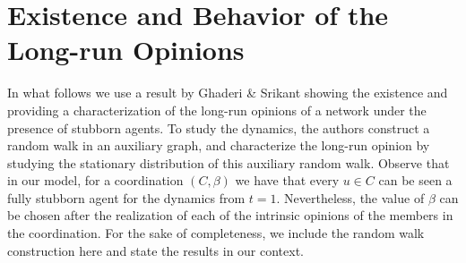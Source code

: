 \documentclass[letterpaper,11pt]{article}
\newcommand{\cost}{\mathsf{cost}}
\newtheorem{lemma}{Lemma}
\newcommand{\vvcom}[1]{\todo[color=red!25!white]{Victor: #1}}
\begin{document}


\begin{comment}
\noindent{\it Sustainability.} Every node $u\in V$ faces a discount factor of $\delta\in (0,1)$, representing the {\color{red} dar la intuicion aca.}
We say that a triplet $(C,\beta,\gamma_0)$ is a {\it sustainable coordination} if for every $u\in C$ we have that
\begin{equation}
\sum_{t=1}^{\infty}\delta^{t}\cost_u(\gamma_{t})\le \sum_{t=1}^{\infty}\delta^{t}\cost_u(\tilde \gamma_{t}),
\end{equation}
where $\tilde \gamma$ is the coordination dynamics for $(C\setminus \{u\},\beta)$.
That is, the expected discounted cost that faces a node $u\in C$ is less than the expected discounted cost faced by not joining the coordination.
\end{comment}

\section{Existence and Behavior of the Long-run Opinions}
\label{sec:auxiliar}
In what follows we use a result by Ghaderi \& Srikant showing the existence and providing a characterization of the long-run opinions of a network under the presence of stubborn agents. 
To study the dynamics, the authors construct a random walk in an auxiliary graph, and characterize the long-run opinion by studying the stationary distribution of this auxiliary random walk.
Observe that in our model, for a coordination $(C,\beta)$ we have that every $u\in C$ can be seen a fully stubborn agent for the dynamics from $t=1$.
Nevertheless, the value of $\beta$ can be chosen after the realization of each of the intrinsic opinions of the members in the coordination.
For the sake of completeness, we include the random walk construction here and state the results in our context.\\
\end{document}
